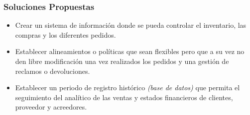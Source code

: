 \documentclass[12pt]{article}
\begin{document}
\vspace{0.5cm}

\subsubsection{ Soluciones Propuestas}
\begin{center}
\begin{minipage}{14cm}
  \begin{itemize}
    \item Crear un sistema de información donde se pueda controlar el
      inventario, las compras y los diferentes pedidos.
    \item Establecer alineamientos o políticas que sean flexibles
      pero que a su vez no den libre modificación una vez realizados los
      pedidos y una gestión de reclamos o devoluciones.
    \item Establecer un periodo de registro histórico
      \textit{(base de datos)} que permita el seguimiento del analítico de
      las ventas y estados financieros de clientes, proveedor y acreedores.
  \end{itemize}

\end{minipage}
\end{center}
\vspace{2cm}
\end{document}
